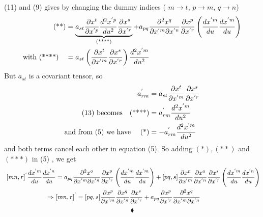 (11) and (9) gives by changing the dummy indices ( $m\rightarrow t$, $p\rightarrow m$, $q\rightarrow n$)
\begin{align}
\text{(**)}&= \underbrace{a_{st}\pdv{x^t}{x^{'p}}\dv[2]{x^{'p}}{u}\pdv{x^s}{x^{'r}}}_\text{(****)}+a_{pq}\pdv{x^q}{x^{'m}}{x^{'n}}\pdv{x^{p}}{x^{'r}}\left(\dv{x^{'m}}{u}\dv{x^{'m}}{u}\right) \\
\text{with (****)}\quad &= a_{st}\left(\pdv{x^t}{x^{'m}}\pdv{x^s}{x^{'r}}\right)\dv[2]{x^{'m}}{u}
\end{align}
But $a_{st}$  is a covariant tensor, so
\begin{align}
\ a^{'}_{rm} &= a_{st}\pdv{x^t}{x^{'m}}\pdv{x^s}{x^{'r}}\\
\text{(13) becomes}\quad \text{(****)} &= a^{'}_{rm}\dv[2]{x^{'m}}{u}\\
\text{and from (5) we have }\quad \text{(*)} &= -a^{'}_{rm}\dv[2]{x^{'m}}{u}\\
\end{align}
and both terms cancel each other in equation (5). So adding $(*), (**)$ and $(***)$ in (5) , we get 
\begin{align}
\ [mn,r]^{'} \dv{x^{'m}}{u}\dv{x^{'n}}{u} &= a_{pq}\pdv{x^q}{x^{'m}}{x^{'n}}\pdv{x^{p}}{x^{'r}}\left(\dv{x^{'m}}{u}\dv{x^{'m}}{u}\right)+[pq,s]\pdv{x^p}{x^{'m}}\pdv{x^q}{x^{'n}}\pdv{x^s}{x^{'r}}\left(\dv{x^{'m}}{u}\dv{x^{'n}}{u}\right)\\
\Rightarrow \ &[mn,r]^{'} =[pq,s]\pdv{x^p}{x^{'m}}\pdv{x^q}{x^{'n}}\pdv{x^s}{x^{'r}}+  a_{pq}\pdv{x^{p}}{x^{'r}}\pdv{x^q}{x^{'m}}{x^{'n}}
\end{align}
$$\blacklozenge$$
\newpage

